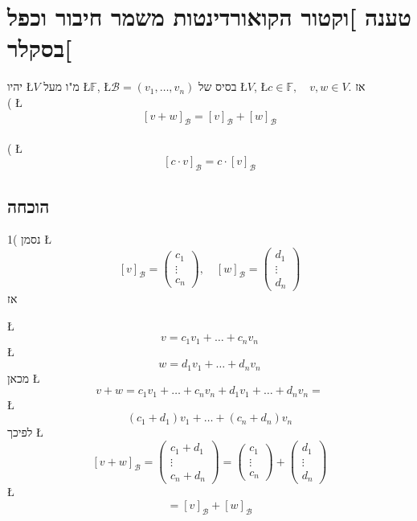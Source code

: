 \documentclass[english,hebrew]{article}
\begin{document}
\section{טענה {]}וקטור הקואורדינטות משמר חיבור וכפל בסקלר{[}}

יהיו \L{$V$} מ"ו מעל \L{$\mathbb{F}$}, \L{$\mathcal{B}=(v_{1},\dots,v_{n})$}
בסיס של \L{$V$}, \L{$c\in\mathbb{F},\quad v,w\in V$}. אז\\

{\endL}( \hspace*{\fill}\L{%
\[
[v+w]_{\mathcal{B}}=[v]_{\mathcal{B}}+[w]_{\mathcal{B}}
\]
}%
\\

{\endL}( \hspace*{\fill}\L{%
\[
[c\cdot v]_{\mathcal{B}}=c\cdot[v]_{\mathcal{B}}
\]
}%

\subsection{הוכחה}

1( נסמן \L{%
\[
[v]_{\mathcal{B}}=\begin{pmatrix}c_{1}\\
\vdots\\
c_{n}
\end{pmatrix},\quad[w]_{\mathcal{B}}=\begin{pmatrix}d_{1}\\
\vdots\\
d_{n}
\end{pmatrix}
\]
}%
אז 

\L{%
\[
v=c_{1}v_{1}+\dots+c_{n}v_{n}
\]
}%
\L{%
\[
w=d_{1}v_{1}+\dots+d_{n}v_{n}
\]
}%
מכאן \L{%
\[
v+w=c_{1}v_{1}+\dots+c_{n}v_{n}+d_{1}v_{1}+\dots+d_{n}v_{n}=
\]
}%
\L{%
\[
(c_{1}+d_{1})v_{1}+\dots+(c_{n}+d_{n})v_{n}
\]
}%
לפיכך \L{%
\[
[v+w]_{\mathcal{B}}=\begin{pmatrix}c_{1}+d_{1}\\
\vdots\\
c_{n}+d_{n}
\end{pmatrix}=\begin{pmatrix}c_{1}\\
\vdots\\
c_{n}
\end{pmatrix}+\begin{pmatrix}d_{1}\\
\vdots\\
d_{n}
\end{pmatrix}
\]
}%
\L{%
\[
=[v]_{\mathcal{B}}+[w]_{\mathcal{B}}
\]
}%
\end{document}
